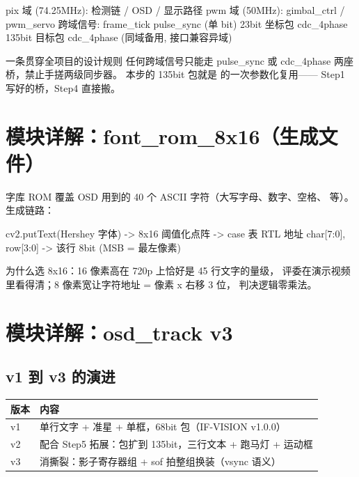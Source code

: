 \begin{Verilog}
pix 域 (74.25MHz):  检测链 / OSD / 显示路径
pwm 域 (50MHz):     gimbal_ctrl / pwm_servo
跨域信号:
   frame_tick    pulse_sync (单 bit)
   23bit 坐标包  cdc_4phase
   135bit 目标包 cdc_4phase (同域备用, 接口兼容异域)
\end{Verilog}

\begin{keybox}{一条贯穿全项目的设计规则}
任何跨域信号只能走 pulse\_sync 或 cdc\_4phase 两座桥，禁止手搓两级同步器。
本步的 135bit 包就是  的一次参数化复用——
Step1 写好的桥，Step4 直接搬。
\end{keybox}

\section{模块详解：font\_rom\_8x16（生成文件）}

字库 ROM 覆盖 OSD 用到的 40 个 ASCII 字符（大写字母、数字、空格、
 等）。生成链路：

\begin{Verilog}
cv2.putText(Hershey 字体) -> 8x16 阈值化点阵 -> case 表 RTL
地址 {char[7:0], row[3:0]} -> 该行 8bit (MSB = 最左像素)
\end{Verilog}

为什么选 8x16：16 像素高在 720p 上恰好是 45 行文字的量级，
评委在演示视频里看得清；8 像素宽让字符地址 = 像素 x 右移 3 位，
判决逻辑零乘法。

\section{模块详解：osd\_track v3}

\subsection{v1 到 v3 的演进}

\begin{center}
\begin{tabular}{lp{8.6cm}}
\toprule
\rowcolor{rowtint}\textbf{版本} & \textbf{内容} \\
\midrule
v1 & 单行文字 + 准星 + 单框，68bit 包（IF-VISION v1.0.0） \\
v2 & 配合 Step5 拓展：包扩到 135bit，三行文本 + 跑马灯 + 运动框 \\
v3 & 消撕裂：影子寄存器组 + sof 拍整组换装（vsync 语义） \\
\bottomrule
\end{tabular}
\end{center}

